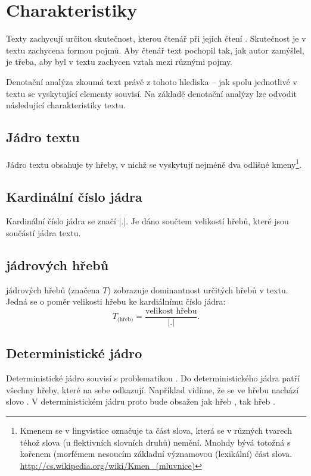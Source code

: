 \documentclass[dp.tex]{subfiles}
\begin{document}
\section{Charakteristiky}

Texty zachycují určitou skutečnost, kterou čtenář při jejich čtení . Skutečnost je v textu zachycena formou pojmů. Aby čtenář text pochopil tak, jak autor zamýšlel, je třeba, aby byl v textu zachycen vztah mezi různými pojmy.

Denotační analýza zkoumá text právě z tohoto hlediska -- jak spolu jednotlivé v textu se vyskytující elementy souvisí. Na základě denotační analýzy lze odvodit následující charakteristiky textu.

\subsection{Jádro textu}
Jádro textu obsahuje ty hřeby, v nichž se vyskytují nejméně dva odlišné kmeny\footnote{Kmenem se v lingvistice označuje ta část slova, která se v různých tvarech téhož slova (u flektivních slovních druhů) nemění. Mnohdy bývá totožná s kořenem (morfémem nesoucím základní významovou (lexikální) část slova. \url{http://cs.wikipedia.org/wiki/Kmen_(mluvnice)} }.

\subsection{Kardinální číslo jádra}
Kardinální číslo jádra se značí |.|. Je dáno součtem velikostí hřebů, které jsou součástí jádra textu.

\subsection{ jádrových hřebů}
 jádrových hřebů (značena $T$) zobrazuje dominantnost určitých hřebů v textu.  Jedná se o poměr velikosti hřebu ke kardiálnímu číslo jádra:
\begin{equation}
T_\text{(hřeb)}=\frac{\text{velikost hřebu}}{|.|}.
\end{equation}

\subsection{Deterministické jádro}
Deterministické jádro souvisí s problematikou  . Do deterministického jádra patří všechny hřeby, které na sebe odkazují. Například vidíme, že se ve hřebu  nachází slovo . V deterministickém jádru proto bude obsažen jak hřeb , tak hřeb .
\end{document}
